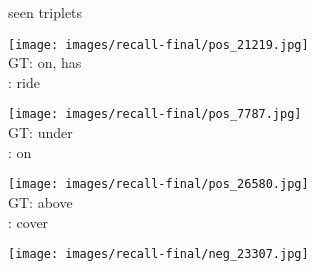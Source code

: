 \documentclass[10pt,twocolumn,letterpaper]{article}
\begin{document}
\begin{figure*}[t]
	\begin{minipage}[b]{0.005\textwidth}
    	\centering
    	\begin{turn}{90}
    	seen triplets
    	\end{turn}
    	\vspace{3.5ex}
    \end{minipage}
    \hspace{0.01\textwidth}
    \begin{minipage}[b]{0.18\textwidth}
    	\centering
       	\texttt{[image: images/recall-final/pos\_21219.jpg]}\\
       	\small{
       	\vspace{0.2ex}
       	GT: on, has\\
       	\cite{Lu16}: ride
       	}
       	\vspace{0.3ex}
    \end{minipage}
    \hspace{0.005\textwidth}
    \begin{minipage}[b]{0.18\textwidth}
       \centering
       \texttt{[image: images/recall-final/pos\_7787.jpg]}\\
       \vspace{0.2ex}
       \small{
       GT: under\\
       \cite{Lu16}: on
       }
       \vspace{0.3ex}
    \end{minipage}
    \hspace{0.005\textwidth}
    \begin{minipage}[b]{0.18\textwidth}
    	\centering
       	\texttt{[image: images/recall-final/pos\_26580.jpg]}\\
       	\vspace{0.2ex}
       	\small{
       	GT: above\\
       	\cite{Lu16}: cover
       	}
       	\vspace{0.3ex}
    \end{minipage}
    \hspace{0.005\textwidth}
    \begin{minipage}[b]{0.18\textwidth}
    	\centering
       	\texttt{[image: images/recall-final/neg\_23307.jpg]}\\

\end{minipage}
\end{figure*}
\end{document}
